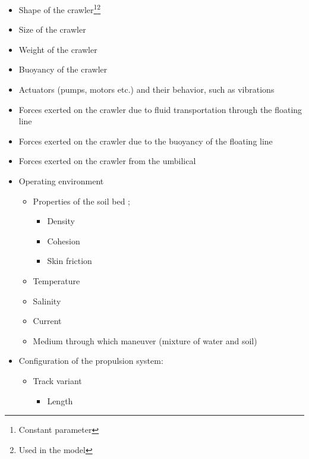 \begin{itemize}
	\setlength\itemsep{0mm}
	\item Shape of the crawler\footnote{\label{c} Constant parameter}\footnote{\label{used} Used in the model}
	\item Size of the crawler\footnotemark[\getrefnumber{c}]
	\item Weight of the crawler\footnotemark[\getrefnumber{c}]
	\item Buoyancy of the crawler\footnotemark[\getrefnumber{c}]
	\item Actuators (pumps, motors etc.) and their behavior, such as vibrations
	\item Forces exerted on the crawler due to fluid transportation through the floating line
	\item Forces exerted on the crawler due to the buoyancy of the floating line
	\item Forces exerted on the crawler from the umbilical
	\item Operating environment
	\begin{itemize}
		\setlength\itemsep{0mm}
		\item Properties of the soil bed \cite{lotman_applicable_2009};
		\begin{itemize}
			\setlength\itemsep{0mm}
			\item Density
			\item Cohesion
			\item Skin friction
		\end{itemize}
		\item Temperature
		\item Salinity
		\item Current
		\item Medium through which maneuver (mixture of water and soil)
	\end{itemize}
	\item Configuration of the propulsion system:
	\begin{itemize}
		\setlength\itemsep{0mm}
		\item Track variant \cite{lotman_applicable_2009}
		\begin{itemize}
			\item Length\footnotemark[\getrefnumber{c}]

\end{itemize}
\end{itemize}
\end{itemize}

